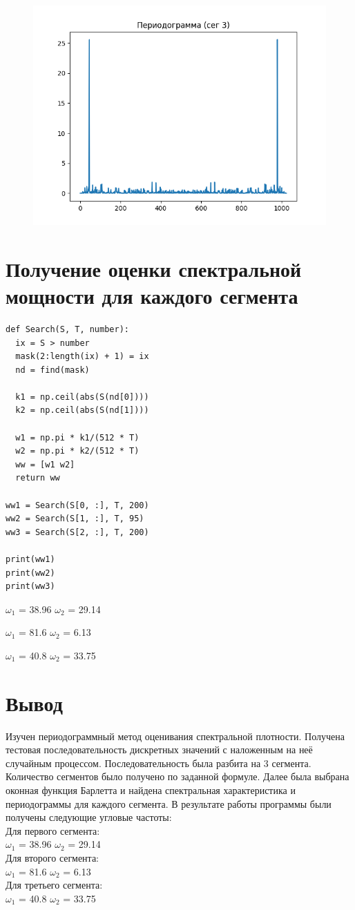 \documentclass[12pt]{article}
\begin{document}
\begin{figure}[!htb]
\centering
\includegraphics[scale=1.00]{period_3.png}
\caption{}
\label{}
\end{figure}



\section{Получение оценки спектральной мощности для каждого сегмента}

\begin{lstlisting}
def Search(S, T, number):
  ix = S > number
  mask(2:length(ix) + 1) = ix
  nd = find(mask)

  k1 = np.ceil(abs(S(nd[0])))
  k2 = np.ceil(abs(S(nd[1])))

  w1 = np.pi * k1/(512 * T)
  w2 = np.pi * k2/(512 * T)
  ww = [w1 w2]
  return ww

ww1 = Search(S[0, :], T, 200)
ww2 = Search(S[1, :], T, 95)
ww3 = Search(S[2, :], T, 200)

print(ww1)
print(ww2)
print(ww3)
\end{lstlisting}


$\omega_1$ = 38.96  
$\omega_2$ = 29.14

$\omega_1$ = 81.6
$\omega_2$ = 6.13

$\omega_1$ = 40.8   
$\omega_2$ = 33.75

\section{Вывод}
Изучен периодограммный метод оценивания спектральной плотности. Получена тестовая последовательность дискретных значений с наложенным на неё случайным процессом. Последовательность была разбита на 3 сегмента. Количество сегментов было получено по заданной формуле. Далее была выбрана оконная функция Барлетта и найдена спектральная характеристика и периодограммы для каждого сегмента.
В результате работы программы были получены следующие угловые частоты:\\

Для первого сегмента:\\
$\omega_1$ = 38.96  
$\omega_2$ = 29.14\\

Для второго сегмента:\\
$\omega_1$ = 81.6
$\omega_2$ = 6.13\\

Для третьего сегмента:\\
$\omega_1$ = 40.8   
$\omega_2$ = 33.75
\end{document}
